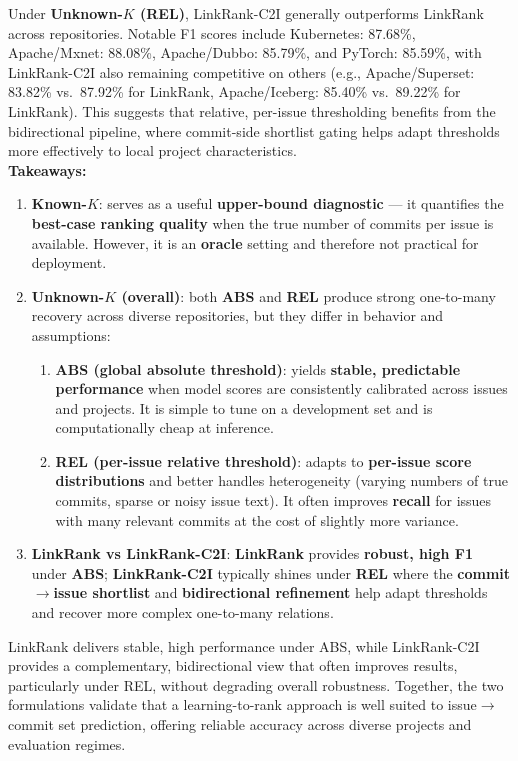 Under \textbf {Unknown-$K$ (REL)}, LinkRank-C2I generally outperforms LinkRank across repositories. Notable F1 scores include Kubernetes: 87.68\%, Apache/Mxnet: 88.08\%, Apache/Dubbo: 85.79\%, and PyTorch: 85.59\%, with LinkRank-C2I also remaining competitive on others (e.g., Apache/Superset: 83.82\% vs.\ 87.92\% for LinkRank, Apache/Iceberg: 85.40\% vs.\ 89.22\% for LinkRank). This suggests that relative, per-issue thresholding benefits from the bidirectional pipeline, where commit-side shortlist gating helps adapt thresholds more effectively to local project characteristics.\\


\textbf{Takeaways:}
\begin{enumerate}
    \item \textbf{Known-$K$}: serves as a useful \textbf{upper-bound diagnostic} — it quantifies the \textbf{best-case ranking quality} when the true number of commits per issue is available. However, it is an \textbf{oracle} setting and therefore not practical for deployment.
        \item \textbf{Unknown-$K$ (overall)}: both \textbf{ABS} and \textbf{REL} produce strong one-to-many recovery across diverse repositories, but they differ in behavior and assumptions:
            \begin{enumerate}
                \item \textbf{ABS (global absolute threshold)}: yields \textbf{stable, predictable performance} when model scores are consistently calibrated across issues and projects. It is simple to tune on a development set and is computationally cheap at inference.
                \item \textbf{REL (per-issue relative threshold)}: adapts to \textbf{per-issue score distributions} and better handles heterogeneity (varying numbers of true commits, sparse or noisy issue text). It often improves \textbf{recall} for issues with many relevant commits at the cost of slightly more variance.
            \end{enumerate}
        \item \textbf{LinkRank vs LinkRank-C2I}: \textbf{LinkRank} provides \textbf{robust, high F1} under \textbf{ABS}; \textbf{LinkRank-C2I} typically shines under \textbf{REL} where the \textbf{commit$\rightarrow$issue shortlist} and \textbf{bidirectional refinement} help adapt thresholds and recover more complex one-to-many relations.
\end{enumerate}
LinkRank delivers stable, high performance under ABS, while LinkRank-C2I provides a complementary, bidirectional view 
that often improves results, particularly under REL, without degrading overall robustness. 
Together, the two formulations validate that a learning-to-rank approach is well suited to issue$\rightarrow$commit set prediction, offering reliable accuracy across diverse projects and evaluation regimes.

